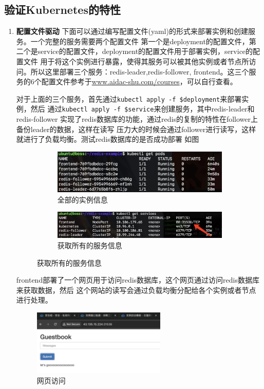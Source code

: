 \documentclass{article}
\begin{document}
\subsection{验证Kubernetes的特性}
\begin{enumerate}
    \item {\textbf{\heiti 配置文件驱动}}
下面可以通过编写配置文件(yaml)的形式来部署实例和创建服务。一个完整的服务需要两个配置文件
第一个是deployment的配置文件，第二个是service的配置文件，deployment的配置文件用于部署实例，service的配置文件
用于将这个实例进行暴露，使得其服务可以被其他实例或者节点所访问。所以这里部署三个服务：redis-leader,redis-follower,
frontend。这三个服务的6个配置文件参考于\url{www.aidac-shu.com/courses}，可以自行查看。

对于上面的三个服务，首先通过\texttt{kubectl apply -f \${deployment}}来部署实例，然后
通过\texttt{kubectl apply -f \${service}}来创建服务，其中redis-leader和redis-follower
实现了redis数据库的功能，通过redis的复制的特性在follower上备份leader的数据，这样在读写
压力大的时候会通过follower进行读写，这样就进行了负载均衡。测试redis数据库的是否成功部署
如图

\begin{figure}[H]
    \begin{subfigure}[b]{0.45\textwidth}
        \centering
        \includegraphics[width=\textwidth]{podsall.png}
        \caption{全部的实例信息}
        \label{fig:podsall}
    \end{subfigure}
    \hfill
    \begin{subfigure}[b]{0.50\textwidth}
        \centering
        \includegraphics[width=\textwidth]{service1.png}
        \caption{获取所有的服务信息}
        \label{fig:service1}
    \end{subfigure}
\end{figure}

frontend部署了一个网页用于访问redis数据库，这个网页通过访问redis数据库来获取数据，然后
这个网站的读写会通过负载均衡分配给各个实例或者节点进行处理。
\begin{figure}[H]
    \centering
    \includegraphics[width=0.6\textwidth]{webpage.png}
    \caption{网页访问}
    \label{fig:webpage}
\end{figure}


\end{enumerate}
\end{document}
